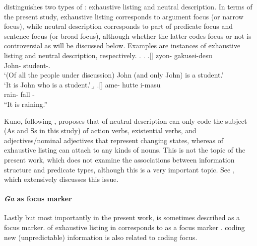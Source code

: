  distinguishes two types of :
exhaustive listing and neutral description.
In terms of the present study,
exhaustive listing corresponds to argument focus (or narrow focus),
while neutral description corresponds to part of predicate focus and sentence focus (or broad focus),
although whether the latter  codes focus or not is controversial
as will be discussed below.
Examples \Next[a-b] are instances of exhaustive listing and
neutral description, respectively.
%
\ex.
 \a. 
 \bg.[] zyon- gakusei-desu \\
      John- student-. \\
      `(Of all the people under discussion) John (and only John) is a student.' \\
      `It is John who is a student.'
 \b. 
 \bg.[] ame- hutte i-masu \\
      rain- fall - \\
      ``It is raining.''
      \hfill{\cite[38]{kuno73}}

Kuno, following ,
proposes that
 of neutral description can only code
the subject (As and Ss in this study) of action verbs,
existential verbs, and
adjectives/nominal adjectives
that represent changing states,
whereas  of exhaustive listing can attach to any kinds of nouns.
This is not the topic of the present work,
which does not examine
the associations between information structure and predicate types,
although this is a very important topic.
See ,
which extensively discusses this issue.


\paragraph{\textit{Ga} as focus marker}
Lastly but most importantly in the present work,
 is sometimes described as a focus marker.
 of exhaustive listing in  corresponds to
 as a focus marker \cite{heycock08}.
 coding new (unpredictable) information \cite[Chapter 25]{kuno73j} is also related to  coding focus.

